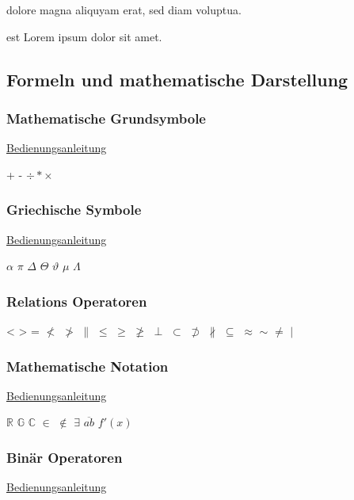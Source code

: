 dolore magna aliquyam erat, sed diam voluptua.\footnotemark
{} 

est Lorem ipsum dolor sit amet.\footnotemark
{}

\subsection{Formeln und mathematische Darstellung}

\subsubsection{Mathematische Grundsymbole}

\href{https://oeis.org/wiki/List_of_LaTeX_mathematical_symbols}{Bedienungsanleitung}

+
-
$\div \ast \times$

\subsubsection{Griechische Symbole}

\href{https://oeis.org/wiki/List_of_LaTeX_mathematical_symbols}{Bedienungsanleitung}

$\alpha$
$\pi$
$\Delta$
$\Theta$
$\vartheta$
$\mu$
$\Lambda$

\subsubsection{Relations Operatoren}

< > =
$\nless$
$\ngtr$
$\parallel$
$\leq$
$\geq$
$\ngeqslant$
$\perp$
$\subset$
$\not\supset$
$\nparallel$
$\subseteq$
$\approx$
$\sim$
$\neq$
$\mid$

\subsubsection{Mathematische Notation}

\href{https://oeis.org/wiki/List_of_LaTeX_mathematical_symbols}{Bedienungsanleitung}

$\mathbb{R}$
$\mathbb{G}$
$\mathbb{C}$
$\in$
$\notin$
$\exists$
$\overline{ab}$
$f'(x)$

\subsubsection{Binär Operatoren}

\href{https://oeis.org/wiki/List_of_LaTeX_mathematical_symbols}{Bedienungsanleitung}

